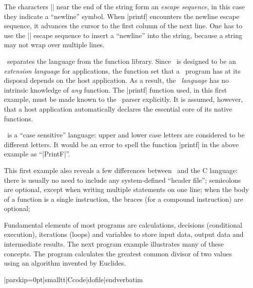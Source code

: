 The characters |\n| near the end of the string form an {\it escape
sequence\/},
in this case they indicate a ``newline'' symbol. When |printf| encounters the
newline escape sequence, it advances the cursor to the first column of the
next line. One has to use the |\n| escape sequence to insert a ``newline''
into the string, because a string may not wrap over multiple lines.

\Small\ separates the language from the function library. Since \Small\ is
designed to be an {\it extension language\/} for applications, the function
set that a \Small\ program has at its disposal depends on the host application.
As a result, the \Small\ {\it language\/} has no intrinsic knowledge of {\it any\/}
function. The |printf| function used, in this first example, must be made known
to the \Small\ parser explicitly. It is assumed, however, that a host application
automatically declares the essential core of its native functions.

\Small\ is a ``case sensitive'' language: upper and lower case letters are considered
to be different letters. It would be an error to spell the function |printf| in
the above example as ``|PrintF|''.

This first example also reveals a few differences between \Small\ and the C language:
\beginlist{1em}\compactlist
\list{\lbullet}
  there is usually no need to include any system-defined ``header file'';
\list{\lbullet}
  semicolons are optional, except when writing multiple statements on one line;
\list{\lbullet}
  when the body of a function is a single instruction, the braces (for a
  compound instruction) are optional;
\endlist

\dingbatseparator

Fundamental elements of most programs are calculations, decisions
(conditional execution), iterations (loops) and variables to store input data,
output data and intermediate results. The next program example illustrates
many of these concepts. The program calculates the greatest common divisor of
two values using an algorithm invented by Euclides.

 
\bigskip{}
\verbatim|parskip=0pt|smalltt|Ccode|dofile|endverbatim\endlistingx

